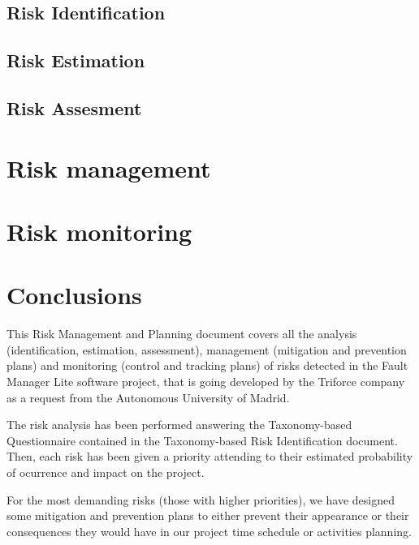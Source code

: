 \documentclass[11pt]{report}
\newcounter{risks}[subsection]
\begin{document}
\section{Risk Identification}
\label{secRiskIdentification}


\section{Risk Estimation}
\label{secRiskEstimation}


\section{Risk Assesment}
\label{secRiskAssesment}


\chapter{Risk management}
\label{chapRiskManagement}



\chapter{Risk monitoring}
\label{chapRiskMonitoring}



\chapter{Conclusions}

This Risk Management and Planning document covers all the analysis (identification, estimation, assessment), management (mitigation and prevention plans) and monitoring (control and tracking plans) of risks detected in the Fault Manager Lite software project, that is going developed by the Triforce company as a request from the Autonomous University of Madrid.

The risk analysis has been performed answering the Taxonomy-based Questionnaire contained in the Taxonomy-based Risk Identification document. Then, each risk has been given a priority attending to their estimated probability of ocurrence and impact on the project.

For the most demanding risks (those with higher priorities), we have designed some mitigation and prevention plans to either prevent their appearance or their consequences they would have in our project time schedule or activities planning.
\end{document}
